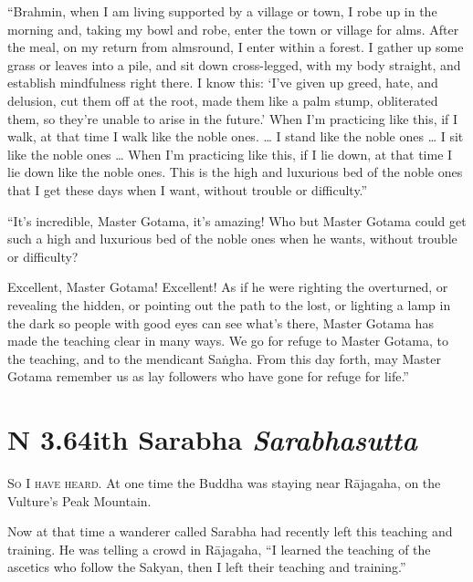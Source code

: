 \documentclass[12pt,openany]{book}%
\newcommand*{\suttatitleacronym}[1]{\smaller[2]{#1}\vspace*{.3em}}
\newcommand*{\suttatitletranslation}[1]{\linebreak{#1}}
\newcommand*{\suttatitleroot}[1]{\linebreak\smaller[2]\itshape{#1}}
\newcommand*{\tocacronym}[1]{\hspace*{-3.3em}{#1}\quad}
\newcommand*{\toctranslation}[1]{#1}
\newcommand*{\tocroot}[1]{(\textit{#1})}
\newcommand*{\scevam}[1]{\textsc{#1}}
\begin{document}
“Brahmin, when I am living supported by a village or town, I robe up in the morning and, taking my bowl and robe, enter the town or village for alms. After the meal, on my return from almsround, I enter within a forest. I gather up some grass or leaves into a pile, and sit down cross-legged, with my body straight, and establish mindfulness right there. I know this: ‘I’ve given up greed, hate, and delusion, cut them off at the root, made them like a palm stump, obliterated them, so they’re unable to arise in the future.’ When I’m practicing like this, if I walk, at that time I walk like the noble ones. … I stand like the noble ones … I sit like the noble ones … When I’m practicing like this, if I lie down, at that time I lie down like the noble ones. This is the high and luxurious bed of the noble ones that I get these days when I want, without trouble or difficulty.” 

“It’s incredible, Master Gotama, it’s amazing! Who but Master Gotama could get such a high and luxurious bed of the noble ones when he wants, without trouble or difficulty? 

Excellent, Master Gotama! Excellent! As if he were righting the overturned, or revealing the hidden, or pointing out the path to the lost, or lighting a lamp in the dark so people with good eyes can see what’s there, Master Gotama has made the teaching clear in many ways. We go for refuge to Master Gotama, to the teaching, and to the mendicant \textsanskrit{Saṅgha}. From this day forth, may Master Gotama remember us as lay followers who have gone for refuge for life.” 

%
\section*{{\suttatitleacronym AN 3.64}{\suttatitletranslation With Sarabha }{\suttatitleroot Sarabhasutta}}
\addcontentsline{toc}{section}{\tocacronym{AN 3.64} \toctranslation{With Sarabha } \tocroot{Sarabhasutta}}

\scevam{So I have heard. }At one time the Buddha was staying near \textsanskrit{Rājagaha}, on the Vulture’s Peak Mountain. 

Now at that time a wanderer called Sarabha had recently left this teaching and training. He was telling a crowd in \textsanskrit{Rājagaha}, “I learned the teaching of the ascetics who follow the Sakyan, then I left their teaching and training.” 
\end{document}
